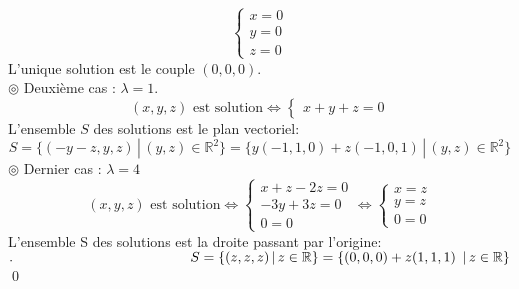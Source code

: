 \documentclass[10pt]{article}
\begin{document}
\begin{tcolorbox}[enhanced, width=7in, center, size=fbox, fontupper=\large, drop shadow southwest]
\begin{equation*}
\begin{cases}
            x=0\\
            y=0\\
            z=0
        \end{cases}
    \end{equation*}
    L'unique solution est le couple $(0,0,0)$.\\
    $\circledcirc$ Deuxième cas : $\lambda=1$.
    \begin{equation*}
        (x,y,z) \text{ est solution}
        \iff\begin{cases}
            x+y+z=0
        \end{cases}
    \end{equation*}
    L'ensemble $S$ des solutions est le plan vectoriel: 
    \begin{equation*}
        S=\{(-y-z,y,z)\,|\, (y,z)\in\mathbb{R}^2\}=\{y(-1,1,0) + z(-1,0,1)\,|\,(y,z)\in\mathbb{R}^2\}
    \end{equation*}
    $\circledcirc$ Dernier cas : $\lambda=4$
    \begin{equation*}
        (x,y,z) \text{ est solution} \iff \begin{cases}
            x+z-2z=0\\
            -3y+3z=0\\
            0=0
        \end{cases}
        \iff\begin{cases}
            x=z\\
            y=z\\
            0=0
        \end{cases}
    \end{equation*}
    L'ensemble S des solutions est la droite passant par l'origine:\\
    $. \hspace{4.5cm} S = \{(z,z,z)\,|\,z\in\mathbb{R}\} = \{(0,0,0) + z(1,1,1)\ \,|\, z\in\mathbb{R}\}$\\
    \qed
\end{tcolorbox}

\end{document}

